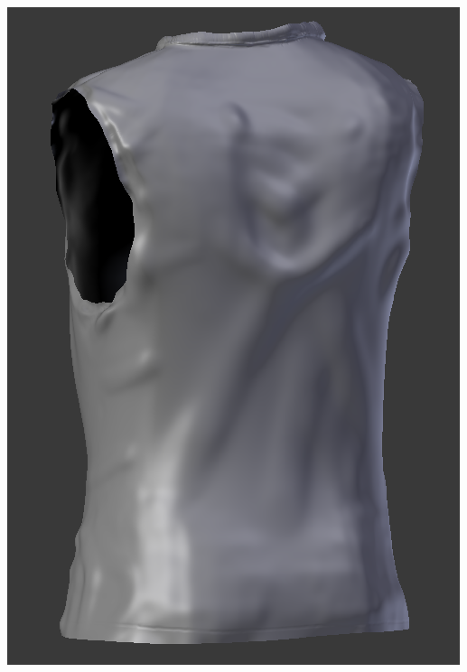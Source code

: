 \documentclass{article}
\begin{document}
  \includegraphics[width=\textwidth]{60.png}
\end{document}
